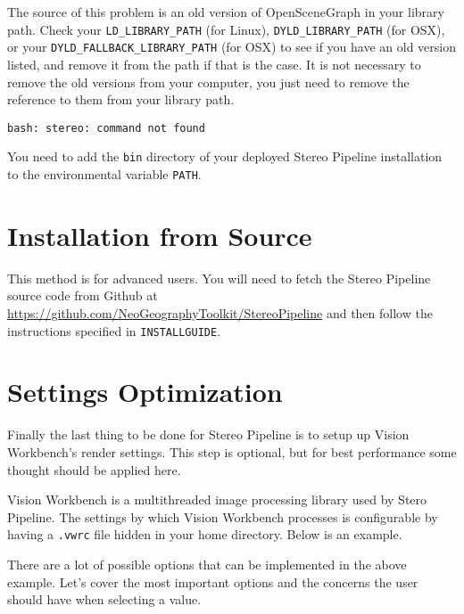 The source of this problem is an old version of OpenSceneGraph in
your library path. Check your \verb#LD_LIBRARY_PATH# (for Linux),
\verb#DYLD_LIBRARY_PATH# (for OSX), or your \verb#DYLD_FALLBACK_LIBRARY_PATH#
(for OSX) to see if you have an old version listed, and remove it
from the path if that is the case. It is not necessary to remove the
old versions from your computer, you just need to remove the reference
to them from your library path.

\begin{verbatim}
bash: stereo: command not found
\end{verbatim}

You need to add the \texttt{bin} directory of your deployed Stereo
Pipeline installation to the environmental variable \texttt{PATH}.

\section{\label{sec:Source-Installation}Installation from Source}

This method is for advanced users. You will need to fetch the Stereo Pipeline source code from Github at
\url{https://github.com/NeoGeographyToolkit/StereoPipeline} and then
follow the instructions specified in \texttt{INSTALLGUIDE}.

\section{\label{sec:Settings}Settings Optimization}

Finally the last thing to be done for Stereo Pipeline is to setup up
Vision Workbench's render settings. This step is optional, but for
best performance some thought should be applied here.

Vision Workbench is a multithreaded image processing library used by
Stero Pipeline. The settings by which Vision Workbench processes is
configurable by having a \texttt{.vwrc} file hidden in your home
directory. Below is an example.

\newpage
\begin{minipage}{0.94\linewidth}
\small{}
\end{minipage}

There are a lot of possible options that can be implemented in the
above example. Let's cover the most important options and the concerns
the user should have when selecting a value.

